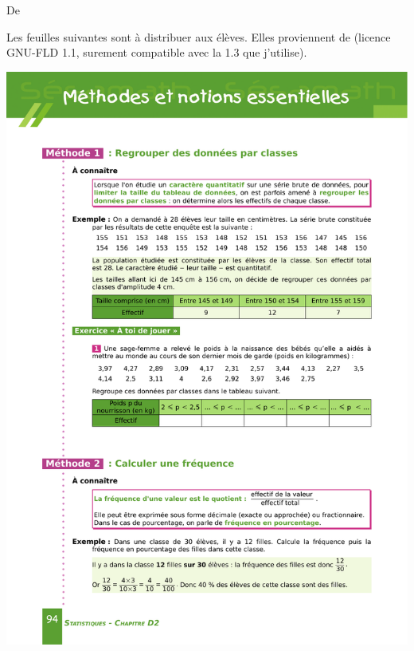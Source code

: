 


De \cite{NRHooXFvgpp5}

\vfill


Les feuilles suivantes sont à distribuer aux élèves. Elles proviennent de \cite{NRHooXFvgpp5} (licence GNU-FLD 1.1, surement compatible avec la 1.3 que j'utilise).


\begin{center}
\includegraphics{sesamath5p94.pdf}
\end{center}
